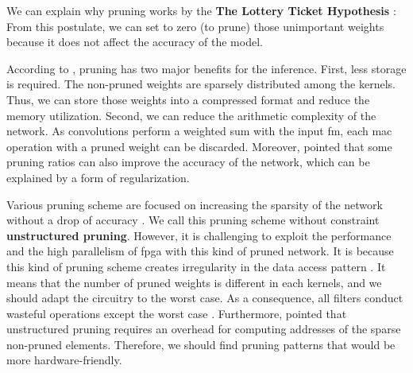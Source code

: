We can explain why pruning works by the \textbf{The Lottery Ticket Hypothesis} \cite{frankle_lottery_2019, frankle_early_2020}:  From this postulate, we can set to zero (to prune) those unimportant weights because it does not affect the accuracy of the model.

According to \textcite{cheng_recent_2018}, pruning has two major benefits for the inference. First, less storage is required. The non-pruned weights are sparsely distributed among the kernels. Thus, we can store those weights into a compressed format and reduce the memory utilization. Second, we can reduce the arithmetic complexity of the network. As convolutions perform a weighted sum with the input \acrshort{fm}, each \acrfull{mac} operation with a pruned weight can be discarded. Moreover, \textcite{han_learning_2015, mao_exploring_2017, kang_accelerator-aware_2020} pointed that some pruning ratios can also improve the accuracy of the network, which can be explained by a form of regularization.

Various pruning scheme are focused on increasing the sparsity of the network without a drop of accuracy \cite{han_learning_2015, han_deep_2016}.  We call this pruning scheme without constraint \textbf{unstructured pruning}. However, it is challenging to exploit the performance and the high parallelism of \acrshort{fpga} with this kind of pruned network. It is because this kind of pruning scheme creates irregularity in the data access pattern \cite{zhu_efficient_2020}. It means that the number of pruned weights is different in each kernels, and we should adapt the circuitry to the worst case. As a consequence, all filters conduct wasteful operations except the worst case \cite{shimoda_filter-wise_2019}. Furthermore, \textcite{anwar_structured_2017} pointed that unstructured pruning requires an overhead for computing addresses of the sparse non-pruned elements. Therefore, we should find pruning patterns that would be more hardware-friendly.

